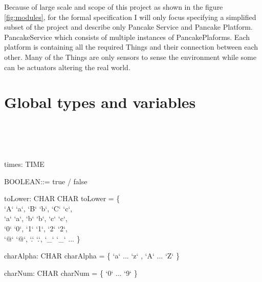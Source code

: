 \documentclass{article}
\begin{document}
Because of large scale and scope of this project as shown in the figure \ref{fig:modules}, for the formal specification I will only focus specifying a simplified subset of the project and describe only Pancake Service and Pancake Platform. PancakeService which consists of multiple instances of PancakePlaforms. Each platform is containing all the required Things and their connection between each other. Many of the Things are only sensors to sense the environment while some can be actuators altering the real world.










\newpage
\section{Global types and variables}

\begin{zed}
  [ CHAR ] \\
  [ ROOM ]  \\
  [ LOCATION ]  \\
  [ TIME ]  
\end{zed}

\begin{axdef}
 times: \iseq TIME
\end{axdef}

\begin {axdef}
 BOOLEAN::= true / false
\end{axdef}

\begin {axdef}
  toLower: CHAR \fun CHAR
\where
  toLower = \{ \\
  \indent `A` \mapsto `a`, `B` \mapsto `b`, `C` \mapsto `c`, \\
  \indent `a` \mapsto `a`, `b` \mapsto `b`, `c` \mapsto `c`, \\
  \indent `0` \mapsto `0`, `1` \mapsto `1`, `2` \mapsto `2`, \\
  \indent `$@$` \mapsto `$@$`, `.` \mapsto `.`, `\_` \mapsto `\_` ... \} 
\end{axdef}


\begin {axdef}
  charAlpha: \power CHAR
\where
  charAlpha = \{ `a` ... `z` , `A` ... `Z` \} 
\end{axdef}


\begin {axdef}
  charNum: \power CHAR
\where
  charNum = \{ `0` ... `9`  \} 
\end{axdef}
\end{document}

